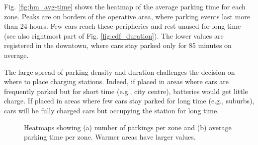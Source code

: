 Fig. \ref{fig:hm_avg-time} shows the heatmap of the average parking time for each zone. Peaks are on borders of the operative area, where parking events last more than 24 hours. Few cars reach these peripheries  and rest unused for long time (see also rightmost part of Fig. \ref{fig:cdf_duration}). The lower values are registered in the downtown, where cars stay parked only for 85 minutes on average.

The large spread of parking density and duration challenges the decision on where to place charging stations. Indeed, if placed in areas where cars are frequently parked but for short time (e.g., city centre), batteries would get little charge. If placed in areas where few cars stay parked for long time (e.g., suburbs),  cars will be fully charged cars but occupying the station for long time.

\begin{figure}[th]
    \centering     %
    	\caption{Heatmaps showing (a) number of parkings per zone  and (b) average parking time per zone. Warmer areas have larger values. }
    	\label{fig:data_car}
\end{figure}

